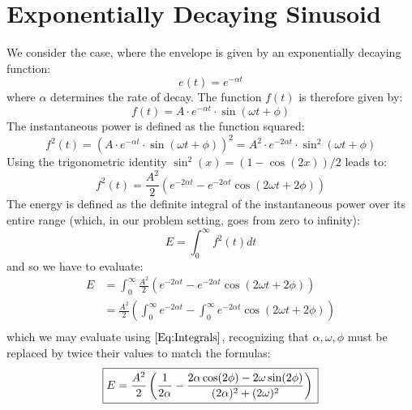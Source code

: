 \section{Exponentially Decaying Sinusoid}
We consider the case, where the envelope is given by an exponentially decaying function:
\begin{equation}
 e(t) = e^{-\alpha t}
\end{equation}
where $\alpha$ determines the rate of decay. The function $f(t)$ is therefore given by:
\begin{equation}
\boxed
{
  f(t) = A \cdot  e^{-\alpha t} \cdot \sin(\omega t + \phi)
}
\end{equation}
The instantaneous power is defined as the function squared:
\begin{equation}
  f^2(t) = \left( A \cdot  e^{-\alpha t} \cdot \sin(\omega t + \phi) \right)^2
         = A^2 \cdot e^{-2\alpha t} \cdot \sin^2(\omega t + \phi)
\end{equation}
Using the trigonometric identity $\sin^2(x) = (1-\cos(2x))/2$ leads to:
\begin{equation}
  f^2(t) = \frac{A^2}{2} \left( e^{-2\alpha t} - e^{-2\alpha t} \cos(2\omega t + 2\phi) \right)
\end{equation}
The energy is defined as the definite integral of the instantaneous power over its entire range (which, in our problem setting, goes from zero to infinity):
\begin{equation}
  E = \int_0^{\infty} f^2(t) dt
\end{equation}
and so we have to evaluate:
\begin{equation}
\begin{aligned}
  E &= \int_0^{\infty} \frac{A^2}{2} \left( e^{-2\alpha t} - e^{-2\alpha t} \cos(2\omega t + 2\phi) \right) \\
    &= \frac{A^2}{2} \left(\int_0^{\infty}  e^{-2\alpha t} - \int_0^{\infty}  e^{-2\alpha t} \cos(2\omega t + 2\phi) \right) \\
\end{aligned}  
\end{equation}
which we may evaluate using $\ref{Eq:Integrals}$, recognizing that $\alpha, \omega, \phi$ must be replaced by twice their values to match the formulas:
\begin{equation}
\boxed
{
  E = \frac{A^2}{2} \left( \frac{1}{2\alpha} - \frac{2\alpha\cos(2\phi)-2\omega\sin(2\phi)}{(2\alpha)^2+(2\omega)^2} \right) \\ 
}
\end{equation}

